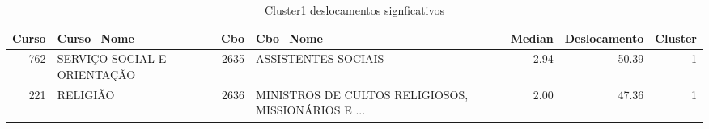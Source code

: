 \begin{table}
\centering
\caption{Cluster1 deslocamentos signficativos }
\label{tab:Salarios_Cluster1}
\begin{tabular}{rlrlrrr}
\toprule
 Curso &                  Curso\_Nome &  Cbo &                                           Cbo\_Nome &  Median &  Deslocamento &  Cluster \\
\midrule
   762 & SERVIÇO SOCIAL E ORIENTAÇÃO & 2635 &                                ASSISTENTES SOCIAIS &    2.94 &         50.39 &        1 \\
   221 &                    RELIGIÃO & 2636 & MINISTROS DE CULTOS RELIGIOSOS, MISSIONÁRIOS E ... &    2.00 &         47.36 &        1 \\
\bottomrule
\end{tabular}
\end{table}
